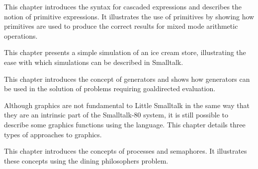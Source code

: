


\secdown











\secdown

This chapter introduces the syntax for cascaded expressions and describes the notion of primitive expressions. It illustrates the use of
primitives by showing how primitives are used to produce the correct
results for mixed mode arithmetic operations.


\secup

\secdown

This chapter presents a simple simulation of an ice cream store, illustrating the ease with which simulations can be described in Smalltalk.


\secup

\secdown

This chapter introduces the concept of generators and shows how
generators can be used in the solution of problems requiring goaldirected evaluation.


\secup

\secdown

Although graphics are not fundamental to Little Smalltalk in the same
way that they are an intrinsic part of the Smalltalk-80 system, it is still
possible to describe some graphics functions using the language. This
chapter details three types of approaches to graphics.


\secup

\secdown

This chapter introduces the concepts of processes and semaphores. It
illustrates these concepts using the dining philosophers problem.


\secup

\secup
